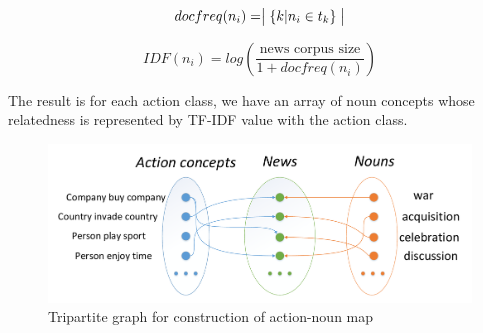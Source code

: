 \begin{equation*}
    docfreq(n_i) = \bigm| \{ k | n_i \in t_k \} \bigm|
\end{equation*}


\begin{equation*}
    IDF(n_i) = log(\frac{\text{news corpus size}}{1 + docfreq(n_i)})
\end{equation*}

The result is for each action class, we have an array of noun concepts whose relatedness is represented by TF-IDF value with the action class.
\begin{figure}[!htp]
 \centering
 \includegraphics[width=\linewidth]{img/tripartite.pdf}
 \caption{Tripartite graph for construction of action-noun map}
\end{figure}
